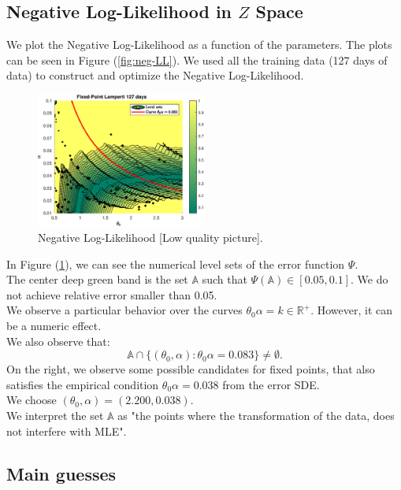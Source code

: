 \documentclass[11pt]{article}
\theoremstyle{definition}
\newcommand{\R}{\mathbb{R}}
\begin{document}
\subsection{Negative Log-Likelihood in $Z$ Space}

We plot the Negative Log-Likelihood as a function of the parameters. The plots can be seen in Figure (\ref{fig:neg-LL}). We used all the training data (127 days of data) to construct and optimize the Negative Log-Likelihood.

\begin{figure}[H]
\centering
\includegraphics[width=0.5\textwidth]{../../MATLAB_Files/Results/likelihood/lamperti/Log-Likelihood.eps}
\caption{Negative Log-Likelihood {\color{red}[Low quality picture]}.}
\label{fig:neg-LLL}
\end{figure}
In Figure (\ref{fig:neg-LLL}), we can see the numerical level sets of the error function $\Psi$.\\
The center deep green band is the set $\mathbb{A}$ such that $\Psi(\mathbb{A})\in[0.05,0.1]$. We do not achieve relative error smaller than 0.05.\\
We observe a particular behavior over the curves $\theta_0\alpha=k\in\R^+$. However, it can be a numeric effect.\\
We also observe that: $$\mathbb{A}\cap\{(\theta_0,\alpha):\theta_0\alpha=0.083\}\neq\emptyset.$$
On the right, we observe some possible candidates for fixed points, that also satisfies the empirical condition $\theta_0\alpha=0.038$ from the error SDE.\\
We choose $(\theta_0,\alpha)=(2.200,0.038)$.\\
We interpret the set $\mathbb{A}$ as "the points where the transformation of the data, does not interfere with MLE".

\subsection{Main guesses}
\end{document}
